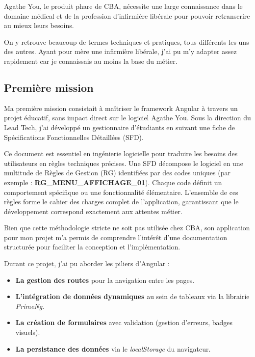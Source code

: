 \documentclass{article}
\begin{document}
Agathe You, le produit phare de CBA, nécessite une large connaissance dans le domaine médical et de la profession d'infirmière libérale pour pouvoir retranscrire au mieux leurs besoins.

On y retrouve beaucoup de termes techniques et pratiques, tous différents les uns des autres.
Ayant pour mère une infirmière libérale, j'ai pu m'y adapter assez rapidement car je connaissais au moins la base du métier.

\subsection{Première mission}

Ma première mission consistait à maîtriser le framework Angular à travers un projet éducatif, sans impact direct sur le logiciel Agathe You. Sous la direction du Lead Tech, j'ai développé un gestionnaire d'étudiants en suivant une fiche de Spécifications Fonctionnelles Détaillées (SFD).

Ce document est essentiel en ingénierie logicielle pour traduire les besoins des utilisateurs en règles techniques précises. Une SFD décompose le logiciel en une multitude de Règles de Gestion (RG) identifiées par des codes uniques (par exemple : \textbf{RG\_MENU\_AFFICHAGE\_01}). Chaque code définit un comportement spécifique ou une fonctionnalité élémentaire. L'ensemble de ces règles forme le cahier des charges complet de l'application, garantissant que le développement correspond exactement aux attentes métier.

Bien que cette méthodologie stricte ne soit pas utilisée chez CBA, son application pour mon projet m'a permis de comprendre l'intérêt d'une documentation structurée pour faciliter la conception et l'implémentation.

Durant ce projet, j'ai pu aborder les piliers d'Angular :

\begin{itemize}
    \item \textbf{La gestion des routes} pour la navigation entre les pages.
    \item \textbf{L'intégration de données dynamiques} au sein de tableaux via la librairie \textit{PrimeNg}.
    \item \textbf{La création de formulaires} avec validation (gestion d'erreurs, badges visuels).
    \item \textbf{La persistance des données} via le \textit{localStorage} du navigateur.
\end{itemize}
\end{document}

